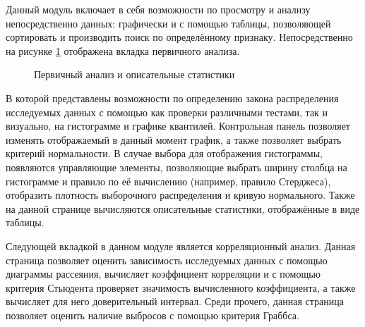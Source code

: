 Данный модуль включает в себя возможности по просмотру и анализу непосредственно данных: графически и с помощью таблицы, позволяющей сортировать и производить поиск по определённому признаку. Непосредственно на рисунке \ref{img:mod_basis} отображена вкладка первичного анализа.
\begin{figure}[ht]
\caption{Первичный анализ и описательные статистики}
\label{img:mod_basis}
\end{figure}
В которой представлены возможности по определению закона распределения исследуемых данных с помощью как проверки различными тестами, так и визуально, на гистограмме и графике квантилей. Контрольная панель позволяет изменять отображаемый в данный момент график, а также позволяет выбрать критерий нормальности. В случае выбора для отображения гистограммы, появляются управляющие элементы, позволяющие выбрать ширину столбца на гистограмме и правило по её вычислению (например, правило Стерджеса), отобразить плотность выборочного распределения и кривую нормального. Также на данной странице вычисляются описательные статистики, отображённые в виде таблицы.

Следующей вкладкой в данном модуле является корреляционный анализ. Данная страница позволяет оценить зависимость исследуемых данных с помощью диаграммы рассеяния, вычисляет коэффициент корреляции и с помощью критерия Стьюдента проверяет значимость вычисленного коэффициента, а также вычисляет для него доверительный интервал. Среди прочего, данная страница позволяет оценить наличие выбросов с помощью критерия Граббса.

